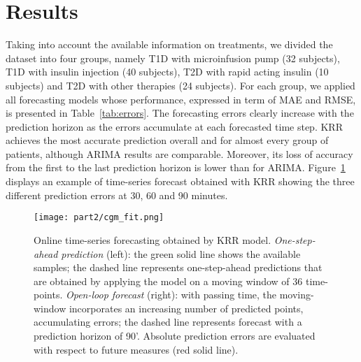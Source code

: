 \section{Results}
Taking into account the available information on treatments, we divided the dataset into four groups, namely T1D with microinfusion pump (32 subjects), T1D with insulin injection (40 subjects), T2D with rapid acting insulin (10 subjects) and T2D with other therapies (24 subjects). For each group, we applied all forecasting models whose performance,
expressed in term of MAE and RMSE, is presented in Table~\ref{tab:errors}. 
The forecasting errors clearly increase with the prediction horizon as the errors accumulate at each forecasted time step. KRR achieves the most accurate prediction overall and for almost every group of patients, although ARIMA results are comparable. Moreover, its loss of accuracy from the first to the last prediction horizon is lower than for ARIMA.
Figure~\ref{fig:fit} displays an example of time-series forecast obtained with KRR showing the three different prediction errors at 30, 60 and 90 minutes.


\begin{figure}[tb]
	\caption{Online time-series forecasting obtained by KRR model. {\em One-step-ahead prediction} (left): the green solid line shows the available samples; the dashed line represents one-step-ahead predictions that are obtained by applying the model on a moving window of 36 time-points. {\em Open-loop forecast} (right): with passing time, the moving-window incorporates an increasing number of predicted points, accumulating errors; the dashed line represents forecast with a prediction horizon of 90'.
		Absolute prediction errors are evaluated with respect to future measures (red solid line).
	}\label{fig:fit}
	\centering
	\texttt{[image: part2/cgm\_fit.png]}
\end{figure}


